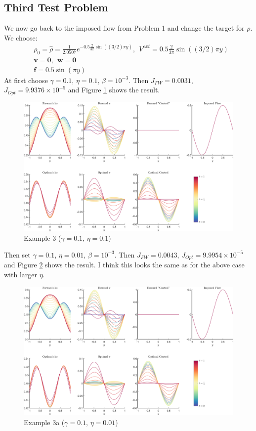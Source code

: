 \documentclass[11pt, a4paper]{article}
\theoremstyle{definition}
\newcommand{\Sta}{\rho}
\newcommand{\Stav}{\mathbf{v}}
\newcommand{\Con}{\mathbf{f}}
\begin{document}
\subsection{Third Test Problem}
We now go back to the imposed flow from Problem 1 and change the target for $\Sta$.
We choose:
\begin{align*}
&\Sta_0 = \hat \Sta = \frac{1}{2.0507}e^{-0.5 \frac{2}{3 \pi}\sin((3/2)\pi y)}, \ \ V^{ext} =0.5 \frac{2}{3 \pi}\sin((3/2)\pi y)\\
&\Stav = \mathbf{0}, \ \  \mathbf{w} = \mathbf{0}\\
&\Con = 0.5 \sin(\pi y) 
\end{align*}
At first choose $\gamma = 0.1$, $\eta = 0.1$, $\beta = 10^{-3}$. Then $J_{FW} = 0.0031$, $J_{Opt} = 9.9376\times 10^{-5}$ and Figure \ref{fig3} shows the result. 
    \begin{figure}
		\includegraphics[scale=0.05]{Example3.png}
		\caption{Example 3 ($\gamma = 0.1$, $\eta = 0.1$)}
		\label{fig3}
    \end{figure} 
Then set $\gamma = 0.1$, $\eta = 0.01$, $\beta = 10^{-3}$. Then $J_{FW} = 0.0043$, $J_{Opt} = 9.9954\times 10^{-5}$ and Figure \ref{fig3a} shows the result. I think this looks the same as for the above case with larger $\eta$.
\begin{figure}
	\includegraphics[scale=0.05]{Example3a.png}
	\caption{Example 3a ($\gamma = 0.1$, $\eta = 0.01$)}
	\label{fig3a}
\end{figure} 
\end{document}
